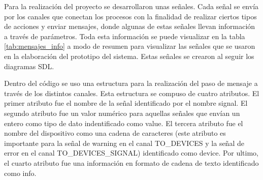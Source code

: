 Para la realización del proyecto se desarrollaron unas señales. Cada señal se envía por los canales que conectan los procesos con la finalidad de realizar ciertos tipos de acciones y enviar mensajes, donde algunas de estas señales llevan información a través de parámetros. Toda esta información se puede visualizar en la tabla \ref{tab:mensajes_info} a modo de resumen para visualizar las señales que se usaron en la elaboración del prototipo del sistema. Estas señales se crearon al seguir los diagramas SDL. 


\begin{table}[!h]
\centering
{}
\caption{Mensajes del sistema con sus parámetros}
\label{tab:mensajes_info}
\end{table}
\pagebreak

Dentro del código se uso una estructura para la realización del paso de mensaje a través de los distintos canales. Esta estructura se compuso de cuatro atributos. El primer atributo fue el nombre de la señal identificado por el nombre signal. El segundo atributo fue un valor numérico para aquellas señales que envían un entero como tipo de dato indentificado como value. El tercera atributo fue el nombre del dispositivo como una cadena de caracteres (este atributo es importante para la señal de warning en el canal TO\_DEVICES y la señal de error en el canal TO\_DEVICES\_SIGNAL) identificado como device. Por ultimo, el cuarto atributo fue una información en formato de cadena de texto identificado como info. 

